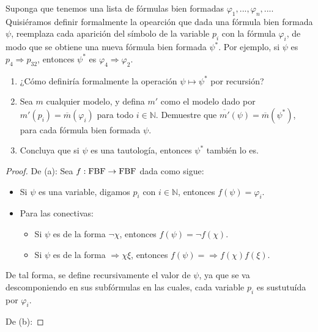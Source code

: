 \documentclass[12pt]{report}
\theoremstyle{largebreak}
\newcommand\cf[3]{\ensuremath{#1:#2\rightarrow#3}}
\begin{document}
    \begin{excer}
        Suponga que tenemos una lista de fórmulas bien formadas $\varphi_1,...,\varphi_n,...$. Quisiéramos definir formalmente la opearción que dada una fórmula bien formada $\psi$, reemplaza cada aparición del símbolo de la variable $p_i$ con la fórmula $\varphi_i$, de modo que se obtiene una nueva fórmula bien formada $\psi^*$. Por ejemplo, si $\psi$ es $p_4\Rightarrow p_{ 32}$, entonces $\psi^*$ es $\varphi_4\Rightarrow\varphi_{ 2}$.
        \begin{enumerate}
            \item ¿Cómo definiría formalmente la operación $\psi\mapsto\psi^*$ por recursión?
            \item Sea $m$ cualquier modelo, y defina $m'$ como el modelo dado por $m'(p_i)=\overline{m}(\varphi_i)$ para todo $i\in\mathbb{N}$. Demuestre que $\overline{m'}(\psi)=\overline{m}(\psi^*)$, para cada fórmula bien formada $\psi$.
            \item Concluya que si $\psi$ es una tautología, entonces $\psi^*$ también lo es.
        \end{enumerate}
    \end{excer}

    \begin{proof}
        De (a): Sea $\cf{f}{\textup{FBF}}{\textup{FBF}}$ dada como sigue:
        \begin{itemize}
            \item Si $\psi$ es una variable, digamos $p_i$ con $i\in\mathbb{N}$, entonces $f(\psi)=\varphi_i$.
            \item Para las conectivas:
            \begin{itemize}
                \item Si $\psi$ es de la forma $\neg\chi$, entonces $f(\psi)=\neg f(\chi)$.
                \item Si $\psi$ es de la forma $\Rightarrow\chi\xi$, entonces $f(\psi)=\Rightarrow f(\chi)f(\xi)$.
            \end{itemize}
        \end{itemize}
        De tal forma, se define recursivamente el valor de $\psi$, ya que se va descomponiendo en sus subfórmulas en las cuales, cada variable $p_i$ es sustutuída por $\varphi_i$.

        De (b): %
    \end{proof}
\end{document}
